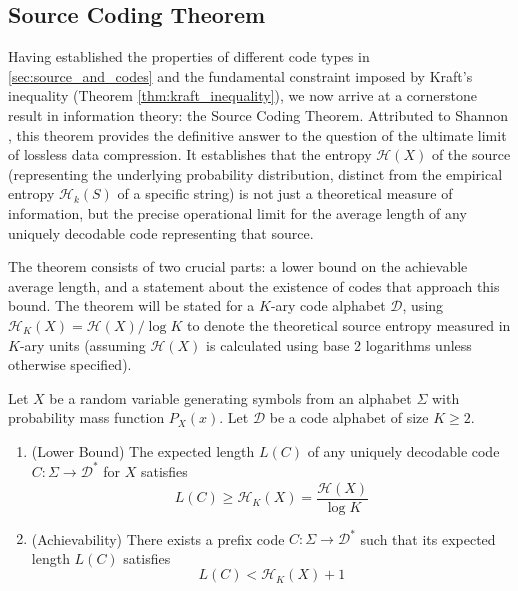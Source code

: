 \subsection{Source Coding Theorem}

\noindent Having established the properties of different code types in \autoref{sec:source_and_codes} and the fundamental constraint imposed by Kraft's inequality (Theorem \autoref{thm:kraft_inequality}), we now arrive at a cornerstone result in information theory: the Source Coding Theorem. Attributed to Shannon \cite{Shannon1948}, this theorem provides the definitive answer to the question of the ultimate limit of lossless data compression. It establishes that the entropy $\mathcal{H}(X)$ of the source (representing the underlying probability distribution, distinct from the empirical entropy $\mathcal{H}_k(S)$ of a specific string) is not just a theoretical measure of information, but the precise operational limit for the average length of any uniquely decodable code representing that source.

\noindent The theorem consists of two crucial parts: a lower bound on the achievable average length, and a statement about the existence of codes that approach this bound. The theorem will be stated for a $K$-ary code alphabet $\mathcal{D}$, using $\mathcal{H}_K(X) = \mathcal{H}(X) / \log K$ to denote the theoretical source entropy measured in $K$-ary units (assuming $\mathcal{H}(X)$ is calculated using base 2 logarithms unless otherwise specified).

\begin{theorem}\label{thm:source_coding_theorem}
    Let $X$ be a random variable generating symbols from an alphabet $\Sigma$ with probability mass function $P_X(x)$. Let $\mathcal{D}$ be a code alphabet of size $K \ge 2$.
    \begin{enumerate}
        \item (Lower Bound) The expected length $L(C)$ of any uniquely decodable code $C: \Sigma \to \mathcal{D}^*$ for $X$ satisfies
              \begin{equation}\label{eq:sct_lower_bound}
                  L(C) \ge \mathcal{H}_K(X) = \frac{\mathcal{H}(X)}{\log K}
              \end{equation}
        \item (Achievability) There exists a prefix code $C: \Sigma \to \mathcal{D}^*$ such that its expected length $L(C)$ satisfies
              \begin{equation}\label{eq:sct_achievability}
                  L(C) < \mathcal{H}_K(X) + 1
              \end{equation}
    \end{enumerate}
\end{theorem}

